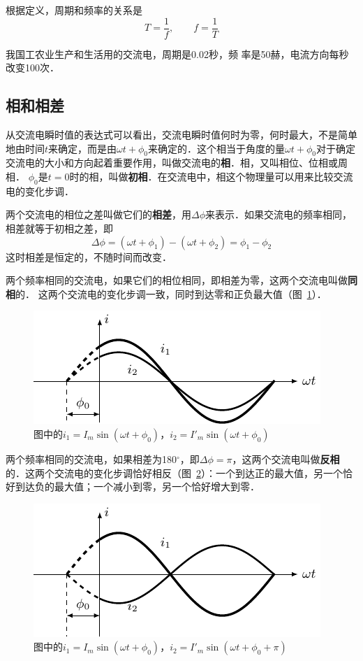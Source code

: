 根据定义，周期和频率的关系是
\[T=\frac{1}{f},\qquad f=\frac{1}{T}\]
	
我国工农业生产和生活用的交流电，周期是0.02秒，频
率是50赫，电流方向每秒改变100次．

\subsection{相和相差}

从交流电瞬时值的表达式可以看出，交流电瞬时值何时为零，何时最大，不是简单地由时间$t$来确定，而是由$\omega t+\phi_0$来确定的．这个相当于角度的量$\omega t+\phi_0$对于确定交流电的大小和方向起着重要作用，叫做交流电的\textbf{相}．相，又叫相位、位相或周相．
$\phi_0$是$t=0$时的相，叫做\textbf{初相}．在交流电中，相这个物理量可以用来比较交流电的变化步调．

两个交流电的相位之差叫做它们的\textbf{相差}，用$\Delta \phi$来表示．如果交流电的频率相同，相差就等于初相之差，即
\[\Delta \phi=(\omega t+\phi_1)-(\omega t+\phi_2)=\phi_1-\phi_2 \]
这时相差是恒定的，不随时间而改变．

两个频率相同的交流电，如果它们的相位相同，即相差为零，这两个交流电叫做\textbf{同相}的．
这两个交流电的变化步调一致，同时到达零和正负最大值（图~\ref{fig_C_3-6}）．
\begin{figure}[htbp]
    \centering
    \includegraphics{fig/C/3-6.pdf}
    \caption{图中的$i_1=I_m\sin(\omega t+\phi_0)$，$i_2=I'_m\sin(\omega t+\phi_0)$}\label{fig_C_3-6}
\end{figure}

两个频率相同的交流电，如果相差为180$^\circ$，即$\Delta\phi=\pi$，这两个交流电叫做\textbf{反相}的．这两个交流电的变化步调恰好相反（图~\ref{fig_C_3-7}）：一个到达正的最大值，另一个恰好到达负的最大值；一个减小到零，另一个恰好增大到零．
\begin{figure}[htbp]
    \centering
    \includegraphics{fig/C/3-7.pdf}
    \caption{图中的$i_1=I_m\sin(\omega t+\phi_0)$，$i_2=I'_m\sin(\omega t+\phi_0+\pi)$}\label{fig_C_3-7}
\end{figure}

